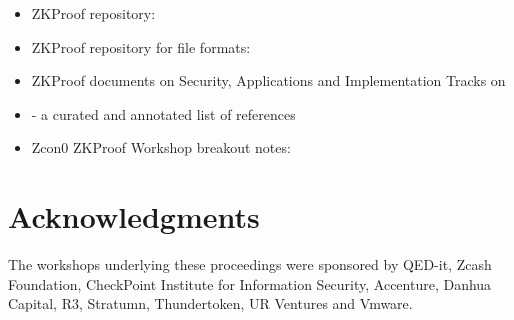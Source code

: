 \begin{itemize}[topsep=0pt]
	\item ZKProof repository: 
	\item ZKProof repository for file formats: 
	\item ZKProof documents on Security, Applications and Implementation Tracks on\\ 
				\sloppy\mbox{}
	\item {} - a curated and annotated list of references
	\item Zcon0 ZKProof Workshop breakout notes: 
\end{itemize}


\section*{Acknowledgments}
\label{prelim:acknowledgments}

The workshops underlying these proceedings were sponsored by 
QED-it, 
Zcash Foundation, 
CheckPoint Institute for Information Security, 
Accenture, 
Danhua Capital, 
R3, 
Stratumn, 
Thundertoken, 
UR Ventures and 
Vmware.

